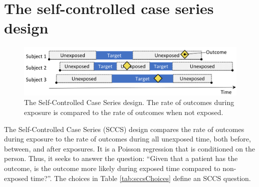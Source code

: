 \documentclass[11pt]{book}
\theoremstyle{definition}
\theoremstyle{definition}
\theoremstyle{definition}
\theoremstyle{remark}
\begin{document}
\hypertarget{the-self-controlled-case-series-design}{%
\section{The self-controlled case series design}\label{the-self-controlled-case-series-design}}

\begin{figure}

{\centering \includegraphics[width=0.9\linewidth]{images/PopulationLevelEstimation/selfControlledCaseSeries} 

}

\caption{The Self-Controlled Case Series design. The rate of outcomes during exposure is compared to the rate of outcomes when not exposed.}\label{fig:selfControlledCaseSeries}
\end{figure}

The Self-Controlled Case Series (SCCS) design \citep{farrington_1995, whitaker_2006} compares the rate of outcomes during exposure to the rate of outcomes during all unexposed time, both before, between, and after exposures. It is a Poisson regression that is conditioned on the person. Thus, it seeks to answer the question: ``Given that a patient has the outcome, is the outcome more likely during exposed time compared to non-exposed time?''. The choices in Table \ref{tab:sccsChoices} define an SCCS question.
\end{document}

